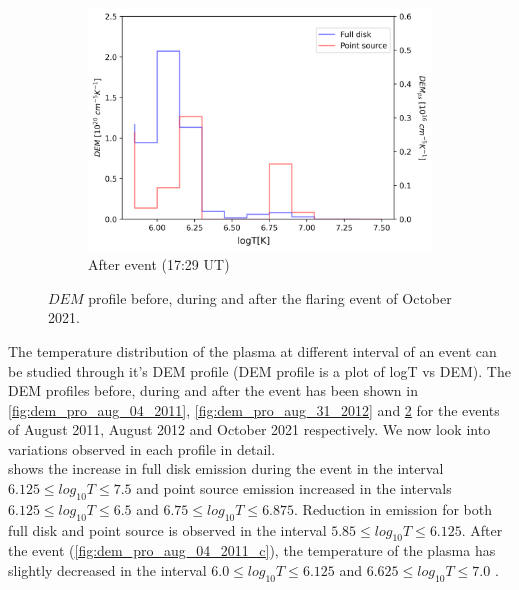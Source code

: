 \begin{figure}[h!]
\begin{subfigure}[b]{0.3\textwidth}
        \centering
        \includegraphics[width=\textwidth]{images/dem_profile_after_event_2021_oct_28.png}
        \caption{After event (17:29 UT)}
        \label{fig:dem_pro_oct_28_2021_c}
    \end{subfigure}
    \caption[DEM profile for  October 2021 event]{$DEM$ profile before, during and after the flaring event of  October 2021.}
    \label{fig:dem_pro_oct_28_2021}
\end{figure}

The temperature distribution of the plasma at different interval of an event can be studied through it's DEM profile (DEM profile is a plot of logT vs DEM). The DEM profiles before, during and after the event has been shown in \cref{fig:dem_pro_aug_04_2011}, \cref{fig:dem_pro_aug_31_2012} and \cref{fig:dem_pro_oct_28_2021} for the events of  August 2011,  August 2012 and  October 2021 respectively. We now look into variations observed in each profile in detail.\\

 shows the increase in full disk emission during the event in the interval $6.125 \le log_{10}T \le 7.5$ and point source emission increased in the intervals $6.125 \le log_{10}T \le 6.5$ and $6.75 \le log_{10}T \le 6.875$. Reduction in emission for both full disk and point source is observed in the interval $5.85 \le log_{10}T \le 6.125$. After the event (\cref{fig:dem_pro_aug_04_2011_c}), the temperature of the plasma has slightly decreased in the interval $6.0 \le log_{10}T \le 6.125$ and $6.625 \le log_{10}T \le 7.0$ .\\


